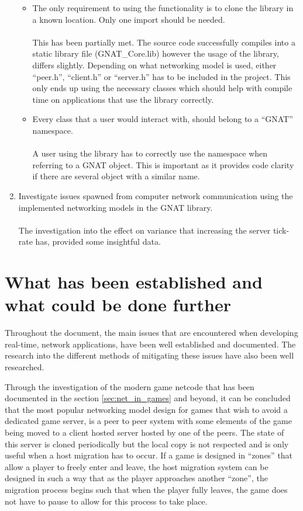 \begin{enumerate}
\begin{itemize}
  \item The only requirement to using the functionality is to clone the library in a known location. Only one import should be needed.
    \\\\
    This has been partially met. The source code successfully compiles into a static library file (GNAT\_Core.lib) however the usage of the library, differs slightly. Depending on what networking model is used, either ``peer.h'', ``client.h'' or ``server.h'' has to be included in the project. This only ends up using the necessary classes which should help with compile time on applications that use the library correctly.


  \item Every class that a user would interact with, should belong to a ``GNAT'' namespace.
    \\\\
    A user using the library has to correctly use the namespace when referring to a GNAT object. This is important as it provides code clarity if there are several object with a similar name.
\end{itemize}


\item Investigate issues spawned from computer network communication using the implemented networking models in the GNAT library.
  \\\\
  The investigation into the effect on variance that increasing the server tick-rate has, provided some insightful data.
\end{enumerate}


\section{What has been established and what could be done further}
Throughout the document, the main issues that are encountered when developing real-time, network applications, have been well established and documented. The research into the different methods of mitigating these issues have also been well researched.

Through the investigation of the modern game netcode that has been documented in the section \ref{sec:net_in_games} and beyond, it can be concluded that the most popular networking model design for games that wish to avoid a dedicated game server, is a peer to peer system with some elements of the game being moved to a client hosted server hosted by one of the peers. The state of this server is cloned periodically but the local copy is not respected and is only useful when a host migration has to occur. If a game is designed in ``zones'' that allow a player to freely enter and leave, the host migration system can be designed in such a way that as the player approaches another ``zone'', the migration process begins such that when the player fully leaves, the game does not have to pause to allow for this process to take place.



